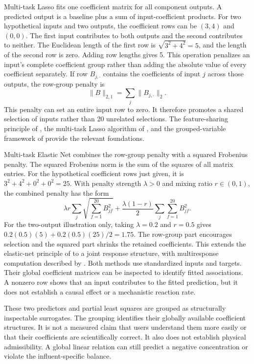 Multi-task Lasso fits one coefficient matrix for all component outputs. A predicted output is a baseline plus a sum of input-coefficient products. For two hypothetical inputs and two outputs, the coefficient rows can be $(3,4)$ and $(0,0)$. The first input contributes to both outputs and the second contributes to neither. The Euclidean length of the first row is $\sqrt{3^2+4^2}=5$, and the length of the second row is zero. Adding row lengths gives 5. This operation penalizes an input's complete coefficient group rather than adding the absolute value of every coefficient separately. If row $B_{j,\cdot}$ contains the coefficients of input $j$ across those outputs, the row-group penalty is
\begin{equation}
\|B\|_{2,1}=\sum_j\|B_{j,\cdot}\|_2.
\label{eq:multiresponse_row_penalty}
\end{equation}
This penalty can set an entire input row to zero. It therefore promotes a shared selection of inputs rather than 20 unrelated selections. The feature-sharing principle of \citet{Argyriou2008}, the multi-task Lasso algorithm of \citet{Liu2009}, and the grouped-variable framework of \citet{Yuan2006} provide the relevant foundations.

Multi-task Elastic Net combines the row-group penalty with a squared Frobenius penalty. The squared Frobenius norm is the sum of the squares of all matrix entries. For the hypothetical coefficient rows just given, it is $3^2+4^2+0^2+0^2=25$. With penalty strength $\lambda>0$ and mixing ratio $r\in(0,1)$, the combined penalty has the form
\[
\lambda r\sum_j\sqrt{\sum_{f=1}^{20}B_{jf}^2}
+\frac{\lambda(1-r)}2\sum_j\sum_{f=1}^{20}B_{jf}^2.
\]
For the two-output illustration only, taking $\lambda=0.2$ and $r=0.5$ gives $0.2(0.5)(5)+0.2(0.5)(25)/2=1.75$. The row-group part encourages selection and the squared part shrinks the retained coefficients. This extends the elastic-net principle of \citet{Zou2005} to a joint response structure, with multiresponse computation described by \citet{Simon2013}. Both methods use standardized inputs and targets. Their global coefficient matrices can be inspected to identify fitted associations. A nonzero row shows that an input contributes to the fitted prediction, but it does not establish a causal effect or a mechanistic reaction rate.

These two predictors and partial least squares are grouped as structurally inspectable surrogates. The grouping identifies their globally available coefficient structures. It is not a measured claim that users understand them more easily or that their coefficients are scientifically correct. It also does not establish physical admissibility. A global linear relation can still predict a negative concentration or violate the influent-specific balance.


